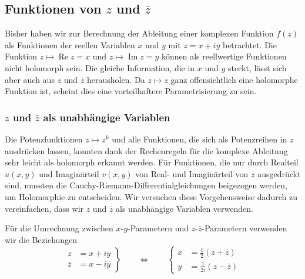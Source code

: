 %
%
%
\subsection{Funktionen von $z$ und $\bar{z}$}
Bisher haben wir zur Berechnung der Ableitung einer komplexen Funktion
$f(z)$ als Funktionen der reellen Variablen $x$ und $y$ mit $z=x+iy$
betrachtet.
Die Funktion $z\mapsto \operatorname{Re}z=x$ und
$z\mapsto \operatorname{Im}z=y$ können als reellwertige Funktionen
nicht holomorph sein.
Die gleiche Information, die in $x$ und $y$ steckt, lässt sich aber auch
aus $z$ und $\bar{z}$ herausholen.
Da $z\mapsto z$ ganz offensichtlich eine holomorphe Funktion ist, scheint
dies eine vorteilhaftere Parametrisierung zu sein.

%
%
\subsubsection{$z$ und $\bar{z}$ als unabhängige Variablen}
Die Potenzfunktionen $z\mapsto z^k$ und alle Funktionen, die sich als 
Potenzreihen in $z$ ausdrücken lassen, konnten dank der Rechenregeln für
die komplexe Ableitung sehr leicht als holomorph erkannt werden.
Für Funktionen, die nur durch Realteil $u(x,y)$ und Imaginärteil $v(x,y)$
von Real- und Imaginärteil von $z$ ausgedrückt sind, mussten die
Cauchy-Riemann-Differentialgleichungen beigezogen werden, um Holomorphie
zu entscheiden.
Wir versuchen diese Vorgehensweise dadurch zu vereinfachen, dass wir
$z$ und $\bar{z}$ als unabhängige Variablen verwenden.

Für die Umrechnung zwischen $x$-$y$-Parametern und $z$-$\bar{z}$-Parametern
verwenden wir die Beziehungen
\begin{equation}
\left.
\begin{aligned}
     z  &= x + iy \\
\bar{z} &= x - iy 
\end{aligned}
\right\}
\qquad\Leftrightarrow\qquad
\left\{
\begin{aligned}
x &= \frac12    (z + \bar{z}) \\
y &= \frac1{2i} (z - \bar{z})
\end{aligned}
\right.
\label{buch:holomorph:nichtholomorph:eqn:xyzzbar}
\end{equation}

